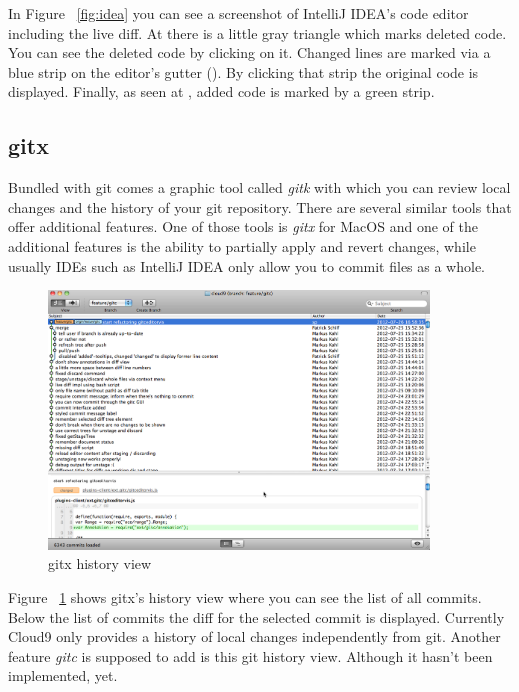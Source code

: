 In Figure ~\ref{fig:idea} you can see a screenshot of IntelliJ IDEA's code editor including the live diff.
At  there is a little gray triangle which marks deleted code.
You can see the deleted code by clicking on it.
Changed lines are marked via a blue strip on the editor's gutter ().
By clicking that strip the original code is displayed.
Finally, as seen at , added code is marked by a green strip.

\subsection{gitx}
\label{subsec:gitx}

Bundled with git comes a graphic tool called \emph{gitk} with which you can review local changes
and the history of your git repository. There are several similar tools that offer additional features.
One of those tools is \emph{gitx} for MacOS and one of the additional features is the ability to partially apply and revert
changes, while usually IDEs such as IntelliJ IDEA only allow you to commit files as a whole.

\begin{figure}
	\centering
	\includegraphics[width=0.9\textwidth]{images/gitx-history.png}
	\caption{gitx history view}
	\label{fig:gitx-history}
\end{figure}

Figure ~\ref{fig:gitx-history} shows gitx's history view where you can see the list of all commits.
Below the list of commits the diff for the selected commit is displayed.
Currently Cloud9 only provides a history of local changes independently from git. Another feature \emph{gitc} is supposed to add
is this git history view. Although it hasn't been implemented, yet.
\vspace{11 pt}

